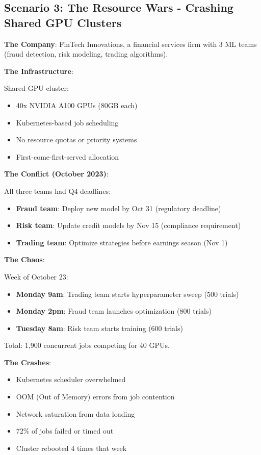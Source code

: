 \subsection{Scenario 3: The Resource Wars - Crashing Shared GPU Clusters}

\textbf{The Company}: FinTech Innovations, a financial services firm with 3 ML teams (fraud detection, risk modeling, trading algorithms).

\textbf{The Infrastructure}:

Shared GPU cluster:
\begin{itemize}
    \item 40x NVIDIA A100 GPUs (80GB each)
    \item Kubernetes-based job scheduling
    \item No resource quotas or priority systems
    \item First-come-first-served allocation
\end{itemize}

\textbf{The Conflict (October 2023)}:

All three teams had Q4 deadlines:
\begin{itemize}
    \item \textbf{Fraud team}: Deploy new model by Oct 31 (regulatory deadline)
    \item \textbf{Risk team}: Update credit models by Nov 15 (compliance requirement)
    \item \textbf{Trading team}: Optimize strategies before earnings season (Nov 1)
\end{itemize}

\textbf{The Chaos}:

Week of October 23:
\begin{itemize}
    \item \textbf{Monday 9am}: Trading team starts hyperparameter sweep (500 trials)
    \item \textbf{Monday 2pm}: Fraud team launches optimization (800 trials)
    \item \textbf{Tuesday 8am}: Risk team starts training (600 trials)
\end{itemize}

Total: 1,900 concurrent jobs competing for 40 GPUs.

\textbf{The Crashes}:

\begin{itemize}
    \item Kubernetes scheduler overwhelmed
    \item OOM (Out of Memory) errors from job contention
    \item Network saturation from data loading
    \item 72\% of jobs failed or timed out
    \item Cluster rebooted 4 times that week
\end{itemize}

